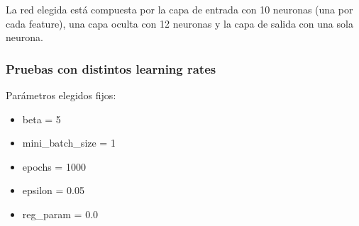 La red elegida está compuesta por la capa de entrada con 10 neuronas (una por cada feature), una capa oculta con 12 neuronas y la capa de salida con una sola neurona. 

\subsubsection{Pruebas con distintos learning rates}

Parámetros elegidos fijos:

\begin{itemize}
\item beta = 5
\item mini\_batch\_size = 1
\item epochs = 1000
\item epsilon = 0.05
\item reg\_param = 0.0
\end{itemize}


